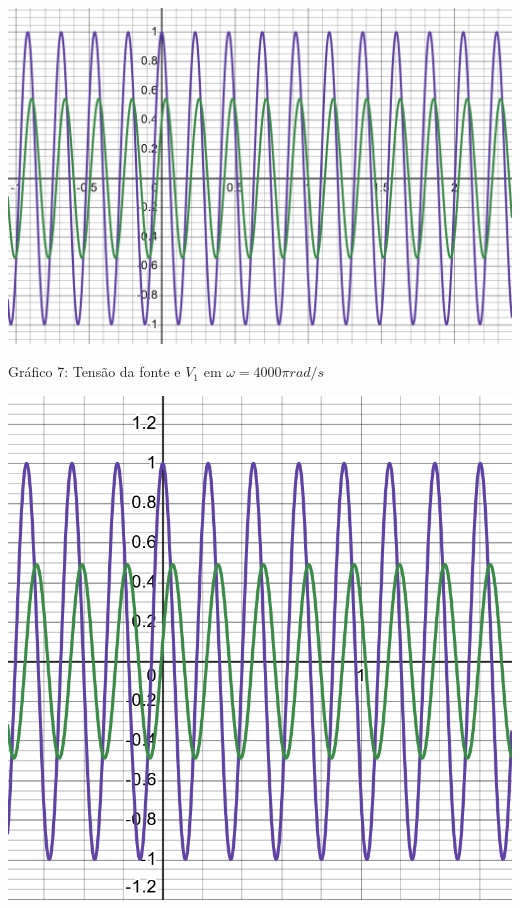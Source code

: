 \documentclass[a4 paper]{article}
\begin{document}
\newpage
\begin{table}[h]
\centering
\includegraphics[scale=0.25]{rgadicoas/grafico4}
\end{table}

\begin{center}
Gráfico 7: Tensão da fonte e $V_1$ em $\omega =4000\pi rad/s$
\end{center}

\vspace{30pt}
\begin{table}[h]
\centering
\includegraphics[scale=0.3]{rgadicoas/grafico8}
\end{table}
\end{document}
